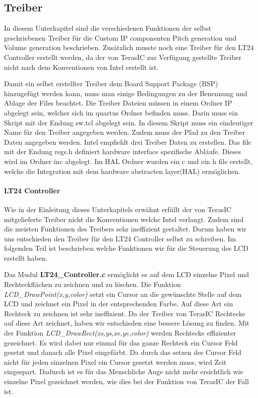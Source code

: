 \subsection{Treiber}\label{subsec:drivers}
In diesem Unterkapitel sind die verschiedenen Funktionen der selbst geschriebenen Treiber für die Custom IP componenten Pitch generation und Volume generation beschrieben. Zusätzlich musste noch eine Treiber für den LT24 Controller erstellt werden, da der von TerasIC zur Verfügung gestellte Treiber nicht nach dem Konventionen von Intel erstellt ist.

Damit ein selbst erstellter Treiber dem Board Support Package (BSP) hinzugefügt werden kann, muss man einige Bedingungen zu der Benennung und Ablage der Files beachtet. Die Treiber Dateien müssen in einem Ordner IP abgelegt sein, welcher sich im quartus Ordner befinden muss. Darin muss ein Skript mit der Endung sw.tcl abgelegt sein. In diesem Skript muss ein eindeutiger Name für den Treiber angegeben werden. Zudem muss der Pfad zu den Treiber Daten angegeben werden. Intel empfiehlt drei Treiber Daten zu erstellen. Das file mit der Endung regs.h definiert hardware interface spezifische Abläufe. Dieses wird im Ordner inc abgelegt. Im HAL Ordner wurden ein c und ein h file erstellt, welche die Integration mit dem hardware abstracten layer(HAL) ermöglichen.

\paragraph{LT24 Controller}

Wie in der Einleitung dieses Unterkapitels erwähnt erfüllt der von TerasIC mitgelieferte Treiber nicht die Konventionen welche Intel verlangt. Zudem sind die meisten Funktionen des Treibers sehr ineffizient gestaltet. Darum haben wir uns entschieden den Treiber für den LT24 Controller selbst zu schreiben. Im folgenden Teil ist beschrieben welche Funktionen wir für die Steuerung des LCD erstellt haben.

Das Mudul \textbf{LT24\_Controller.c} ermöglicht es auf dem LCD einzelne Pixel und Rechteckflächen zu zeichnen und zu löschen. Die Funktion \textit{LCD\_DrawPoint(x,y,color)} setzt ein Cursor an die gewünschte Stelle auf dem LCD und zeichnet ein Pixel in der entsprechenden Farbe. Auf diese Art ein Rechteck zu zeichnen ist sehr ineffizient. Da der Treiber von TerasIC Rechtecke auf diese Art zeichnet, haben wir entschieden eine bessere Lösung zu finden. Mit der Funktion \textit{LCD\_DrawRect(xs,ys,xe,ye,color)}  werden Rechtecke effizienter gezeichnet. Es wird dabei nur einmal für das ganze Rechteck ein Cursor Feld gesetzt und danach alle Pixel eingefärbt. Da durch das setzen des Cursor Feld nicht für jeden einzelnen Pixel ein Cursor gesetzt werden muss, wird  Zeit eingespart. Dadurch ist es für das Menschliche Auge nicht mehr ersichtlich wie einzelne Pixel gezeichnet werden, wie dies bei der Funktion von TerasIC der Fall ist. 

